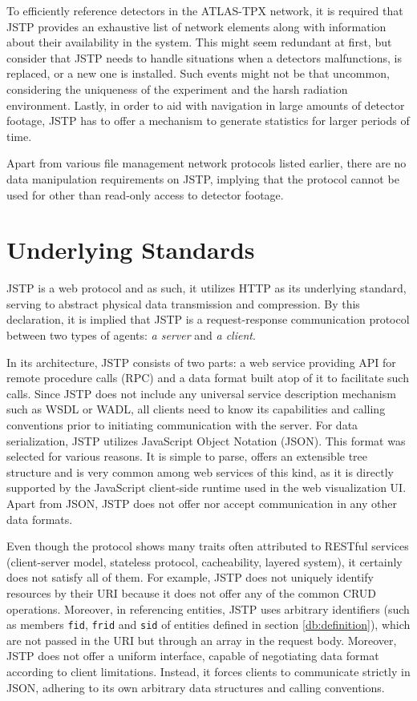 To efficiently reference detectors in the ATLAS-TPX network, it is required that JSTP provides an exhaustive list of network elements along with information about their availability in the system. This might seem redundant at first, but consider that JSTP needs to handle situations when a detectors malfunctions, is replaced, or a new one is installed. Such events might not be that uncommon, considering the uniqueness of the experiment and the harsh radiation environment. Lastly, in order to aid with navigation in large amounts of detector footage, JSTP has to offer a mechanism to generate statistics for larger periods of time.

Apart from various file management network protocols listed earlier, there are no data manipulation requirements on JSTP, implying that the protocol cannot be used for other than read-only access to detector footage.

\section{Underlying Standards}
JSTP is a web protocol and as such, it utilizes HTTP as its underlying standard, serving to abstract physical data transmission and compression. By this declaration, it is implied that JSTP is a request-response communication protocol between two types of agents: \textit{a server} and \textit{a client}.

In its architecture, JSTP consists of two parts: a web service providing API for remote procedure calls (RPC) and a data format built atop of it to facilitate such calls. Since JSTP does not include any universal service description mechanism such as WSDL or WADL, all clients need to know its capabilities and calling conventions prior to initiating communication with the server. For data serialization, JSTP utilizes JavaScript Object Notation (JSON). This format was selected for various reasons. It is simple to parse, offers an extensible tree structure and is very common among web services of this kind, as it is directly supported by the JavaScript client-side runtime used in the web visualization UI. Apart from JSON, JSTP does not offer nor accept communication in any other data formats.

Even though the protocol shows many traits often attributed to RESTful services (client-server model, stateless protocol, cacheability, layered system), it certainly does not satisfy all of them. For example, JSTP does not uniquely identify resources by their URI because it does not offer any of the common CRUD operations. Moreover, in referencing entities, JSTP uses arbitrary identifiers (such as members \texttt{fid}, \texttt{frid} and \texttt{sid} of entities defined in section \ref{db:definition}), which are not passed in the URI but through an array in the request body. Moreover, JSTP does not offer a uniform interface, capable of negotiating data format according to client limitations. Instead, it forces clients to communicate strictly in JSON, adhering to its own arbitrary data structures and calling conventions.

